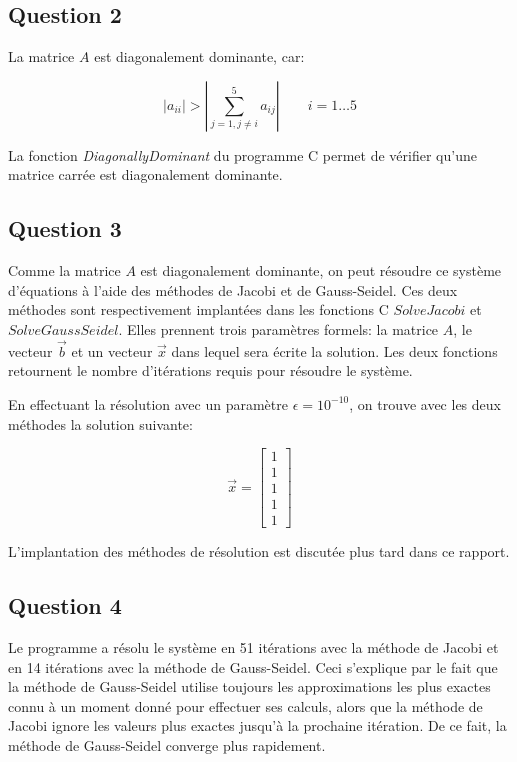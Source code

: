 \documentclass[10pt]{article}
\begin{document}
\subsection{Question 2}

La matrice $A$ est diagonalement dominante, car:

\[
|a_{ii}| > \left|\sum_{j=1, j \ne i}^5a_{ij}\right| \quad\quad i=1\ldots 5
\]

La fonction \emph{DiagonallyDominant} du programme C permet de
vérifier qu'une matrice carrée est diagonalement dominante.

\subsection{Question 3}

Comme la matrice $A$ est diagonalement dominante, on peut résoudre ce
système d'équations à l'aide des méthodes de Jacobi et de
Gauss-Seidel.  Ces deux méthodes sont respectivement implantées dans
les fonctions C $SolveJacobi$ et $SolveGaussSeidel$.  Elles prennent
trois paramètres formels: la matrice $A$, le vecteur $\vec{b}$ et un
vecteur $\vec{x}$ dans lequel sera écrite la solution.  Les deux
fonctions retournent le nombre d'itérations requis pour résoudre le
système.

En effectuant la résolution avec un paramètre $\epsilon = 10^{-10}$,
on trouve avec les deux méthodes la solution suivante:

\[
\vec{x} = \begin{bmatrix}
  1 \\ 1 \\ 1 \\ 1 \\ 1
\end{bmatrix}
\]

L'implantation des méthodes de résolution est discutée plus tard dans
ce rapport.

\subsection{Question 4}

Le programme a résolu le système en 51 itérations avec la méthode de
Jacobi et en 14 itérations avec la méthode de Gauss-Seidel.  Ceci
s'explique par le fait que la méthode de Gauss-Seidel utilise toujours
les approximations les plus exactes connu à un moment donné pour
effectuer ses calculs, alors que la méthode de Jacobi ignore les
valeurs plus exactes jusqu'à la prochaine itération. De ce fait, la
méthode de Gauss-Seidel converge plus rapidement.
\end{document}
